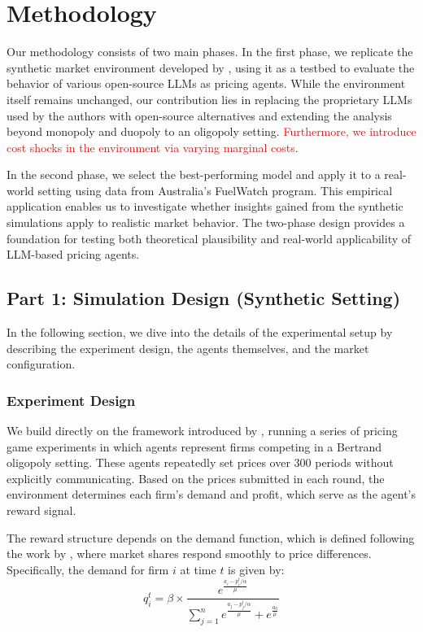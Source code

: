 \section{Methodology}

Our methodology consists of two main phases. In the first phase, we replicate the synthetic market environment developed by \textcite{fish_algorithmic_2025}, using it as a testbed to evaluate the behavior of various open-source LLMs as pricing agents. While the environment itself remains unchanged, our contribution lies in replacing the proprietary LLMs used by the authors with open-source alternatives and extending the analysis beyond monopoly and duopoly to an oligopoly setting. \textcolor{red}{Furthermore, we introduce cost shocks in the environment via varying marginal costs}.

In the second phase, we select the best-performing model and apply it to a real-world setting using data from Australia's FuelWatch program. This empirical application enables us to investigate whether insights gained from the synthetic simulations apply to realistic market behavior. The two-phase design provides a foundation for testing both theoretical plausibility and real-world applicability of LLM-based pricing agents.


\subsection{Part 1: Simulation Design (Synthetic Setting)}

In the following section, we dive into the details of the experimental setup by describing the experiment design, the agents themselves, and the market configuration.

\subsubsection*{Experiment Design}

We build directly on the framework introduced by \textcite{fish_algorithmic_2025}, running a series of pricing game experiments in which agents represent firms competing in a Bertrand oligopoly setting. These agents repeatedly set prices over 300 periods without explicitly communicating. Based on the prices submitted in each round, the environment determines each firm's demand and profit, which serve as the agent’s reward signal.

The reward structure depends on the demand function, which is defined following the work by \textcite{calvano_artificial_2020}, where market shares respond smoothly to price differences. Specifically, the demand for firm $i$ at time $t$ is given by:
\begin{equation}
    q_i^t = \beta \times \frac{e^{\frac{a_i - p_i^t/\alpha}{\mu}}}{\sum_{j=1}^{n} e^{\frac{a_j - p_j^t/\alpha}{\mu}} + e^{\frac{a_0}{\mu}}}
\end{equation}

